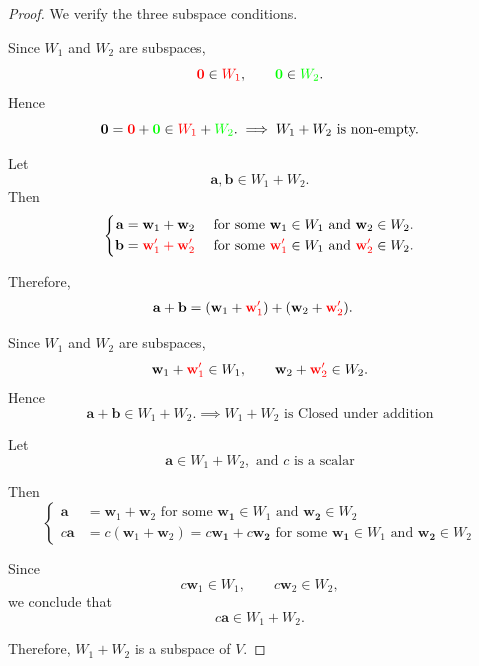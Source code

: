 \documentclass[12pt]{article}
\begin{document}
\begin{proof}
We verify the three subspace conditions.

\bigskip


Since $W_1$ and $W_2$ are subspaces,
\[
\textcolor{red}{\mathbf{0}}\in \textcolor{red}{W_1},\qquad \textcolor{green}{\mathbf{0}}\in \textcolor{green}{W_2}.
\]
Hence
\[
\mathbf{0}=\textcolor{red}{\mathbf{0}}+\textcolor{green}{\mathbf{0}}\in \textcolor{red}{W_1}+\textcolor{green}{W_2}. \implies W_1 + W_2 \text{ is non-empty.}
\]


Let
\[
\mathbf{a},\mathbf{b}\in W_1+W_2.
\]
Then
\[
\left\{
\begin{aligned}
\mathbf{a}&=\mathbf{w}_1+\mathbf{w}_2 \quad \text{ for some } \mathbf{w}_1\in W_1 \text{ and } \mathbf{w}_2\in W_2. \\
\mathbf{b}&=\textcolor{red}{\mathbf{w}_1'+\mathbf{w}_2'} \quad \text{ for some } \textcolor{red}{\mathbf{w}_1'}\in W_1 \text{ and } \textcolor{red}{\mathbf{w}_2'}\in W_2.
\end{aligned}
\right.
\]

Therefore,
\[
\begin{aligned}
\mathbf{a}+\mathbf{b}
&=(\mathbf{w}_1+\textcolor{red}{\mathbf{w}_1'})+(\mathbf{w}_2+\textcolor{red}{\mathbf{w}_2'}).
\end{aligned}
\]

Since $W_1$ and $W_2$ are subspaces,
\[
\mathbf{w}_1+\textcolor{red}{\mathbf{w}_1'}\in W_1, \qquad \mathbf{w}_2+\textcolor{red}{\mathbf{w}_2'}\in W_2.
\]
Hence
\[
\mathbf{a}+\mathbf{b}\in W_1+W_2. \implies W_1 + W_2 \text{ is Closed under addition}
\]


Let
\[
\mathbf{a}\in W_1+W_2, \text{ and } c \text{ is a scalar}
\]

Then
\[
\left\{
\begin{aligned}
\mathbf{a}&=\mathbf{w}_1+\mathbf{w}_2 \text{ for some } \mathbf{w_1}\in W_1 \text{ and } \mathbf{w_2}\in W_2\\
c\mathbf{a}&=c(\mathbf{w}_1+\mathbf{w}_2)=c\mathbf{w_1}+c\mathbf{w_2} \text{ for some } \mathbf{w_1}\in W_1 \text{ and } \mathbf{w_2}\in W_2        
\end{aligned}
\right.
\]

Since
\[
c\mathbf{w}_1\in W_1,\qquad c\mathbf{w}_2\in W_2,
\]
we conclude that
\[
c\mathbf{a}\in W_1+W_2.
\]

Therefore, $W_1+W_2$ is a subspace of $V$.
\end{proof}
\end{document}
